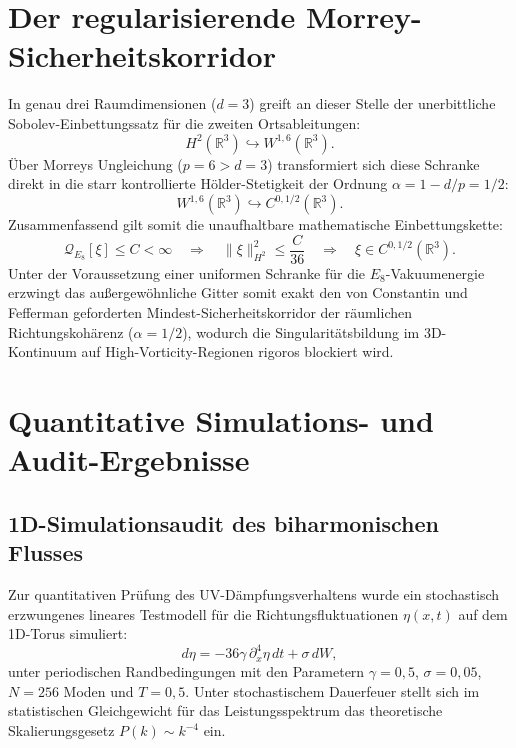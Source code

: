 \documentclass[11pt,twoside,a4paper]{article}
\begin{document}
	\section{Der regularisierende Morrey-Sicherheitskorridor}
	In genau drei Raumdimensionen ($d=3$) greift an dieser Stelle der unerbittliche Sobolev-Einbettungssatz für die zweiten Ortsableitungen:
	\begin{equation}
		H^2(\mathbb{R}^3) \hookrightarrow W^{1,6}(\mathbb{R}^3).
	\end{equation}
	Über Morreys Ungleichung ($p = 6 > d = 3$) transformiert sich diese Schranke direkt in die starr kontrollierte Hölder-Stetigkeit der Ordnung $\alpha = 1 - d/p = 1/2$:
	\begin{equation}
		W^{1,6}(\mathbb{R}^3) \hookrightarrow C^{0, 1/2}(\mathbb{R}^3).
	\end{equation}
	Zusammenfassend gilt somit die unaufhaltbare mathematische Einbettungskette:
	\begin{equation}
		\boxed{ \mathcal{Q}_{E_8}[\xi] \le C < \infty \quad \Longrightarrow \quad \|\xi\|_{H^2}^2 \le \frac{C}{36} \quad \Longrightarrow \quad \xi \in C^{0, 1/2}(\mathbb{R}^3) }.
	\end{equation}
	Unter der Voraussetzung einer uniformen Schranke für die $E_8$-Vakuumenergie erzwingt das außergewöhnliche Gitter somit exakt den von Constantin und Fefferman geforderten Mindest-Sicherheitskorridor der räumlichen Richtungskohärenz ($\alpha = 1/2$), wodurch die Singularitätsbildung im 3D-Kontinuum auf High-Vorticity-Regionen rigoros blockiert wird.
	
	\section{Quantitative Simulations- und Audit-Ergebnisse}
	
	\subsection{1D-Simulationsaudit des biharmonischen Flusses}
	Zur quantitativen Prüfung des UV-Dämpfungsverhaltens wurde ein stochastisch erzwungenes lineares Testmodell für die Richtungsfluktuationen $\eta(x,t)$ auf dem 1D-Torus simuliert:
	\begin{equation}
		d\eta = -36\gamma\,\partial_x^4\eta\,dt + \sigma\,dW,
	\end{equation}
	unter periodischen Randbedingungen mit den Parametern $\gamma=0{,}5$, $\sigma=0{,}05$, $N=256$ Moden und $T=0{,}5$. Unter stochastischem Dauerfeuer stellt sich im statistischen Gleichgewicht für das Leistungsspektrum das theoretische Skalierungsgesetz $P(k) \sim k^{-4}$ ein.
	
\end{document}
